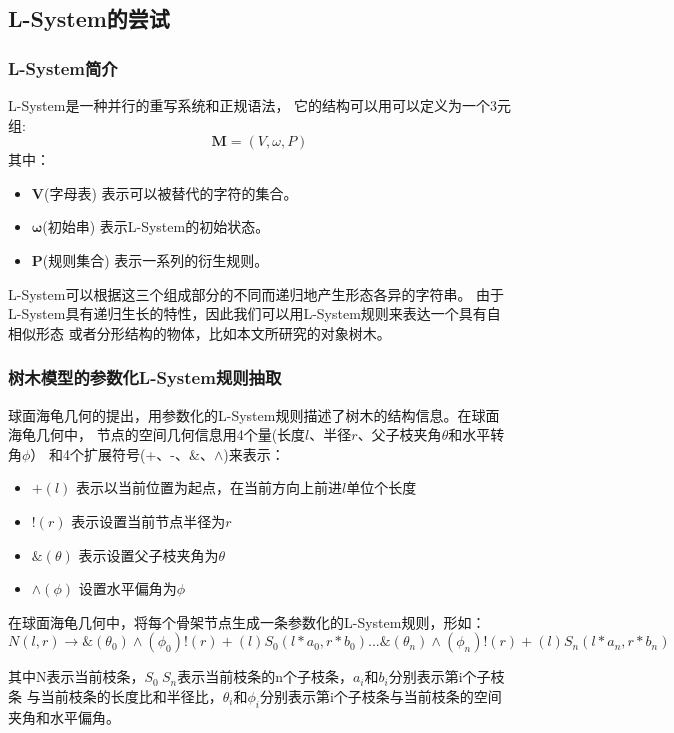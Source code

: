 \subsection{L-System的尝试}
\label{subsec:lsystem}

\subsubsection{L-System简介}
L-System是一种并行的重写系统和正规语法，
它的结构可以用可以定义为一个3元组:\\
\[\mathbf{M} = (V, \omega, P)\]
其中：\\
\begin{itemize}
	\item $\mathbf{V}$(字母表) 表示可以被替代的字符的集合。
	\item $\mathbf{\omega}$(初始串) 表示L-System的初始状态。
	\item $\mathbf{P}$(规则集合) 表示一系列的衍生规则。
\end{itemize}
L-System可以根据这三个组成部分的不同而递归地产生形态各异的字符串。
由于L-System具有递归生长的特性，因此我们可以用L-System规则来表达一个具有自相似形态
或者分形结构的物体，比如本文所研究的对象\raisebox{0.5mm}{------}树木。

\subsubsection{树木模型的参数化L-System规则抽取}
球面海龟几何的提出，用参数化的L-System规则描述了树木的结构信息。在球面海龟几何中，
节点的空间几何信息用4个量(长度$l$、半径$r$、父子枝夹角$\theta$和水平转角$\phi$）
和4个扩展符号(+、-、\&、$\wedge$)来表示：
\begin{itemize}
	\item $+(l)$	表示以当前位置为起点，在当前方向上前进$l$单位个长度
	\item $!(r)$	表示设置当前节点半径为$r$
	\item $\&(\theta)$	表示设置父子枝夹角为$\theta$
	\item $\wedge(\phi)$	设置水平偏角为$\phi$
\end{itemize}
在球面海龟几何中，将每个骨架节点生成一条参数化的L-System规则，形如：\\
\begin{equation} \label{eq:turtle}
N(l,r) \rightarrow \&(\theta_0)\wedge(\phi_0)!(r) + (l)S_0(l*a_0,r*b_0)...\&(\theta_n)\wedge(\phi_n)!(r) + (l)S_n(l*a_n,r*b_n)
\end{equation}

其中N表示当前枝条，$S_0~S_n$表示当前枝条的n个子枝条，$a_i和b_i$分别表示第i个子枝条
与当前枝条的长度比和半径比，$\theta_i和\phi_i$分别表示第i个子枝条与当前枝条的空间
夹角和水平偏角。

